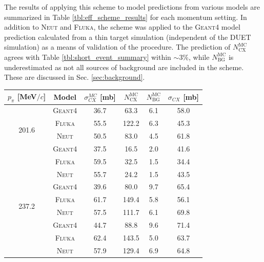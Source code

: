 The results of applying this scheme to model predictions from various models are summarized in Table \ref{tbl:eff_scheme_results} for each momentum setting. In addition to \textsc{Neut} and \textsc{Fluka}, the scheme was applied to the \textsc{Geant4} model prediction calculated from a thin target simulation (independent of the DUET simulation) as a means of validation of the procedure. The prediction of $N_{\mathrm{CX}}^{\mathrm{MC}}$ agrees with Table \ref{tbl:short_event_summary} within $\sim$3\%, while $N_{\mathrm{BG}}^{\mathrm{MC}}$ is underestimated as not all sources of background are included in the scheme. These are discussed in Sec. \ref{sec:background}.
\begin{table}[htbp]
\begin{center}
\begin{tabular}{c|c|c|c|c|c}
\hline
$p_{\pi}$ [MeV$/c$] & Model & $\sigma_{CX}^{MC}$ [mb] &  $N_{\mathrm{CX}}^{\mathrm{MC}}$  &  $N_{\mathrm{BG}}^{\mathrm{MC}}$  &  $\sigma_{CX}$ [mb] \\ \hline
\multirow{4}{*}{201.6} %
& \textsc{Geant4} & 36.7 & 63.3 & 6.1 & 58.0 \\
& \textsc{Fluka} & 55.5 & 122.2 & 6.3 & 45.3 \\
& \textsc{Neut} & 50.5 & 83.0 & 4.5 & 61.8 \\ \hline

\multirow{4}{*}{216.6} %
& \textsc{Geant4} & 37.5 & 16.5 & 2.0 & 41.6 \\
& \textsc{Fluka} & 59.5 & 32.5 & 1.5 & 34.4  \\
& \textsc{Neut} & 55.7 & 24.2 & 1.5 & 43.5 \\ \hline

\multirow{4}{*}{237.2} %
& \textsc{Geant4} & 39.6 & 80.0 & 9.7 & 65.4 \\
& \textsc{Fluka} & 61.7 & 149.4 & 5.8 & 56.1 \\
& \textsc{Neut} & 57.5 & 111.7 & 6.1 & 69.8 \\ \hline

\multirow{4}{*}{265.5} %
& \textsc{Geant4} & 44.7 & 88.8 & 9.6 & 71.4 \\
& \textsc{Fluka} & 62.4 & 143.5 & 5.0 & 63.7 \\
& \textsc{Neut} & 57.9 & 129.4 & 6.9 & 64.8 \\ \hline


\end{tabular}
\end{center}
\end{table}
